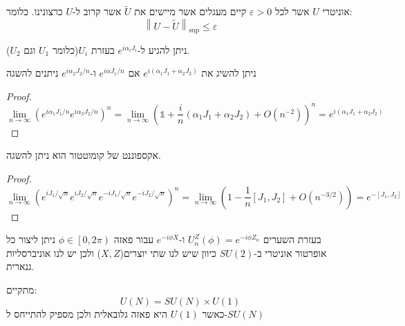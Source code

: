 \documentclass{tstextbook}
\begin{document}
\begin{definition}
אוניטרי \(U\) אשר לכל \(\varepsilon> 0\) קיים מעגלים אשר מיישים את \(\tilde{U}\) אשר קרוב ל-\(U\) כרצונינו. כלומר:
$$\left\lVert  U-\widetilde{U}  \right\rVert _{\sup }\leq \varepsilon$$

\end{definition}
\begin{corollary}
ניתן להגיע ל-\(e^{ i\alpha_{i}J_{i} }\) בעזרת \(U_{i}\)(כלומר \(U_{1}\) וגם \(U_{2}\)).

\end{corollary}
\begin{corollary}
ניתן להשיג את \(e^{ i\left( \alpha_{1}J_{1}+\alpha_{2}J_{2} \right) }\) אם \(e^{ i\alpha J_{1}/n }\) ו-\(e^{ i\alpha_{2}J_{2}/n }\) ניתנים להשגה

\end{corollary}
\begin{proof}
$${\operatorname*{lim}_{n\longrightarrow\infty}\left(e^{i\alpha_{1}J_{1}/n}e^{i\alpha_{2}J_{2}/n}\right)^{n}}{{}=\operatorname*{lim}_{n\longrightarrow\infty}\left(\mathbb{1} +{\frac{i}{n}}\left(\alpha_{1}J_{1}+\alpha_{2}J_{2}\right)+O\left(n^{-2}\right)\right)^{n}}=e^{ i\left( \alpha_{1} J_{1}+\alpha_{2} J_{2} \right) }$$

\end{proof}
\begin{corollary}
אקספוננט של קומוטטור הוא ניתן להשגה.

\end{corollary}
\begin{proof}
$$\operatorname*{lim}_{n\longrightarrow\infty}\left(e^{i J_{1}/\sqrt{n}}e^{i J_{2}/\sqrt{n}}e^{-i J_{1}/\sqrt{n}}e^{-i J_{2}/\sqrt{n}}\right)^{n}=\operatorname*{lim}_{n\longrightarrow\infty}\left(1-{\frac{1}{n}}\left[J_{1},J_{2}\right]+O\left(n^{-3/2}\right)\right)=e^{-\left[J_{1},J_{2}\right]}$$

\end{proof}
\begin{example}
בעזרת השערים \(U_{n}^{Z}\left( \phi \right)=e^{ -i\phi Z_{n} }\) ו-\(e^{ -i\phi X }\) עבור פאזה \(\phi \in \left[ 0,2\pi \right)\) ניתן ליצור כל אופרטור אוניטרי ב-\(SU(2)\) כיוון שיש לנו שתי יוצרים(\(X,Z\)) ולכן יש לנו אוניברסליות גנארית.

\end{example}
\begin{reminder}
מתקיים:
$$U(N)=SU(N)\times U(1)$$
כאשר \(U(1)\) היא פאזה גלובאלית ולכן מספיק להתייחס ל-\(SU(N)\)

\end{reminder}
\end{document}
